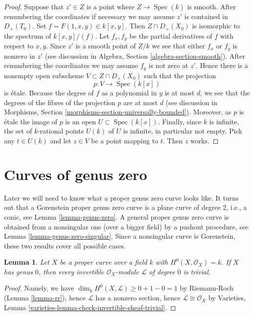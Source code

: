 \documentclass{stacks-project}
\theoremstyle{plain}
\newtheorem{lemma}[subsection]{Lemma}
\theoremstyle{definition}
\theoremstyle{remark}
\numberwithin{equation}{subsection}
\def\Spec{\mathop{\mathrm{Spec}}}
\begin{document}
\begin{proof}
Suppose that $z' \in Z$ is a point where $Z \to \Spec(k)$ is smooth.
After renumbering the coordinates if necessary we may assume
$z'$ is contained in $D_+(T_0)$. Set $f = F(1, x, y) \in k[x, y]$.
Then $Z \cap D_+(X_0)$ is isomorphic to the spectrum of $k[x, y]/(f)$.
Let $f_x, f_y$ be the partial derivatives of $f$ with respect to
$x, y$. Since $z'$ is a smooth point of $Z/k$ we see that either
$f_x$ or $f_y$ is nonzero in $z'$ (see discussion in
Algebra, Section \ref{algebra-section-smooth}).
After renumbering the coordinates
we may assume $f_y$ is not zero at $z'$. Hence there is a nonempty
open subscheme $V \subset Z \cap D_{+}(X_0)$ such that the
projection
$$
p : V \longrightarrow \Spec(k[x])
$$
is \'etale. Because the degree of $f$ as a polynomial in $y$
is at most $d$, we see that the degrees of the fibres of the
projection $p$ are at most $d$ (see discussion in
Morphisms, Section \ref{morphisms-section-universally-bounded}).
Moreover, as $p$ is \'etale
the image of $p$ is an open $U \subset \Spec(k[x])$.
Finally, since $k$ is infinite, the set of $k$-rational points
$U(k)$ of $U$ is infinite, in particular not empty. Pick any
$t \in U(k)$ and let $z \in V$ be a point mapping to $t$.
Then $z$ works.
\end{proof}





\section{Curves of genus zero}
\label{section-genus-zero}

\noindent
Later we will need to know what a proper genus zero curve looks like.
It turns out that a Gorenstein proper genus zero curve is a plane
curve of degree $2$, i.e., a conic, see Lemma \ref{lemma-genus-zero}.
A general proper genus zero curve is obtained from a nonsingular one
(over a bigger field) by a pushout procedure, see
Lemma \ref{lemma-genus-zero-singular}.
Since a nonsingular curve is Gorenstein, these two results
cover all possible cases.

\begin{lemma}
\label{lemma-genus-zero-pic}
Let $X$ be a proper curve over a field $k$ with $H^0(X, \mathcal{O}_X) = k$.
If $X$ has genus $0$, then every invertible $\mathcal{O}_X$-module
$\mathcal{L}$ of degree $0$ is trivial.
\end{lemma}

\begin{proof}
Namely, we have $\dim_k H^0(X, \mathcal{L}) \geq 0 + 1 - 0 = 1$
by Riemann-Roch (Lemma \ref{lemma-rr}), hence $\mathcal{L}$ has a
nonzero section, hence $\mathcal{L} \cong \mathcal{O}_X$ by
Varieties, Lemma \ref{varieties-lemma-check-invertible-sheaf-trivial}.
\end{proof}
\end{document}
